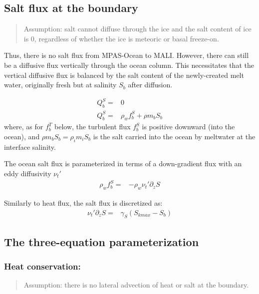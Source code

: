 \documentclass[11pt]{report}
\newcommand{\bea}{\begin{eqnarray}}
\newcommand{\eea}{\end{eqnarray}}
\begin{document}

\subsection{Salt flux at the boundary}

\begin{quote}
    Assumption: salt cannot diffuse through the ice and the salt content of ice is 0, regardless of whether the ice is meteoric or basal freeze-on.
\end{quote}

Thus, there is no salt flux from MPAS-Ocean to MALI. However, there can still be a diffusive flux vertically through the ocean column. This necessitates that the vertical diffusive flux is balanced by the salt content of the newly-created melt water, originally fresh but at salinity $S_b$ after diffusion.

\bea
    Q_b^S =& 0\\
    Q_b^S =& \rho_w f_b^S + \rho m_b S_b
\eea
where, as for $f_b^T$ below, the turbulent flux $f_b^S$ is positive downward (into the ocean), and $\rho m_b S_b = \rho_i m_i S_b$ is the salt carried into the ocean by meltwater at the interface salinity.

The ocean salt flux is parameterized in terms of a down-gradient flux with an eddy diffusivity $\nu_t'$
\bea
    \rho_w f_b^S =& -\rho_w \nu_t' \partial_z S
\eea

Similarly to heat flux, the salt flux is discretized as:
\bea
    \nu_t' \partial_z S =& \gamma_S(S_{kmax} - S_b)
\eea

\subsection{The three-equation parameterization}

\subsubsection{Heat conservation:}

\begin{quote}
    Assumption: there is no lateral advection of heat or salt at the boundary.
\end{quote}
\end{document}

